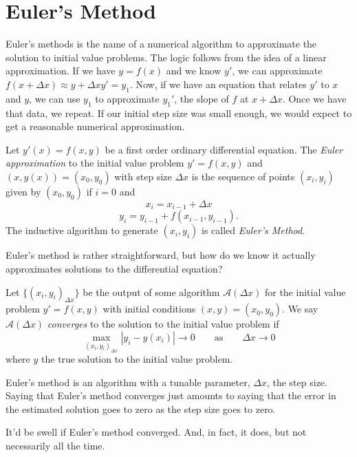 \documentclass{problemset}
\begin{document}
	\section*{Euler's Method}

	Euler's methods is the name of a numerical algorithm to approximate the solution to
	initial value problems.  The logic follows from the idea of a linear approximation.
	If we have $y=f(x)$ and we know $y'$, we can approximate $f(x+\Delta x) \approx y+\Delta x y'=y_1$.
	Now, if we have an equation that relates $y'$ to $x$ and $y$, we can use $y_1$ to approximate
	$y_1'$, the slope of $f$ at $x+\Delta x$.  Once we have that data, we repeat.  If our initial 
	step size was small enough, we would expect to get a reasonable numerical approximation.

	\begin{definition}
		Let $y'(x)=f(x,y)$ be a first order ordinary differential equation.  The \emph{Euler approximation}
		to the initial value problem $y'=f(x,y)$ and $(x, y(x))=(x_0,y_0)$ with step size $\Delta x$ is
		the sequence of points $(x_i,y_i)$ given by $(x_0,y_0)$ if $i=0$ and 
		\[
			x_i = x_{i-1}+\Delta x
		\]
		\[
			y_i = y_{i-1} + f(x_{i-1}, y_{i-1}).
		\]
		The inductive algorithm to generate $(x_i,y_i)$ is called \emph{Euler's Method}.
	\end{definition}

	Euler's method is rather straightforward, but how do we know it actually approximates 
	solutions to the differential equation?

	\begin{definition}
		Let $\{(x_i,y_i)_{\Delta x}\}$ be the output of some algorithm $\mathcal A(\Delta x)$ for the initial
		value problem $y'=f(x,y)$ with initial conditions $(x,y)=(x_0,y_0)$.  We say $\mathcal A(\Delta x)$
		\emph{converges} to the solution to the initial value problem if
		\[
			\max_{(x_i,y_i)_{\Delta x}} | y_i - y(x_i)| \to 0\qquad \text{as}\qquad \Delta x\to 0
		\]
		where $y$ the true solution to the initial value problem.
	\end{definition}

	Euler's method is an algorithm with a tunable parameter, $\Delta x$, the step size.
	Saying that Euler's method converges just amounts to saying that the error
	in the estimated solution goes to zero as the step size goes to zero.

	It'd be swell if Euler's method converged.  And, in fact, it does, but not 
	necessarily all the time.
\end{document}
